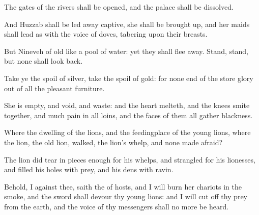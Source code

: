 {The
gates of the
rivers shall be
opened, and the
palace shall be
dissolved.

And
Huzzab shall be led away
captive, she shall be brought
up, and her
maids shall
lead
{} as with the
voice of
doves,
tabering upon their
breasts.

But
Nineveh
{} of
old like a
pool of
water: yet they shall flee
away.
Stand,
stand,
{} but none shall look
back.

Take ye the
spoil of
silver, take the
spoil of
gold: for
{} none
end of the
store
{}
glory out of all the
pleasant
furniture.

She is
empty, and
void, and
waste: and the
heart
melteth, and the
knees smite
together, and much
pain
{} in all
loins, and the
faces of them all
gather
blackness.


\par }{\PP {}Where
{} the
dwelling of the
lions, and the
feedingplace of the young
lions, where the
lion,
{} the old
lion,
walked,
{} the
lion’s
whelp, and none made
{}
afraid?

The
lion did tear in
pieces
enough for his
whelps, and
strangled for his
lionesses, and
filled his
holes with
prey, and his
dens with
ravin.

Behold, I
{} against thee,
saith the
{} of
hosts, and I will
burn her
chariots in the
smoke, and the
sword shall
devour thy young
lions: and I will cut
off thy
prey from the
earth, and the
voice of thy
messengers shall no more be
heard.




\par }
